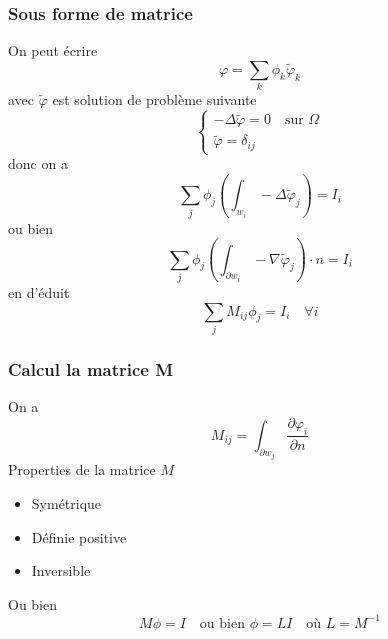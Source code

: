 \begin{frame}
\frametitle{Sous forme de matrice}
On peut \'ecrire
 \begin{equation}
 \varphi = \sum_k \phi_k \tilde{\varphi}_k
 \end{equation}
 avec $\tilde{\varphi}$ est solution de probl\`eme suivante 
 \begin{equation}
 \begin{cases}
 -\Delta\tilde{\varphi} = 0 \quad \text{sur } \Omega \\
 \tilde{\varphi} = \delta_{ij} 
 \end{cases}
 \end{equation}
 donc on a
 \begin{equation}
 \sum_j \phi_j \left( \int_{w_i}-\Delta\tilde{\varphi}_j \right) =I_i
 \end{equation}
 ou bien
 \begin{equation}
  \sum_j \phi_j \left( \int_{\partial w_i}-\nabla\tilde{\varphi}_j \right) \cdot n =I_i
 \end{equation}
 en d'\'eduit
  \begin{equation}
  \sum_j M_{ij}\phi_j =I_i \quad \forall i 
 \end{equation}
%


\end{frame} 

 \begin{frame}
\frametitle{Calcul la matrice M}
On a
\begin{equation}
  M_{ij} = \int_{\partial w_j} \frac{\partial\varphi_i}{\partial n}
\end{equation}
 Properties de la matrice $M$
 \begin{itemize}
 \item Sym\'etrique 
 \item D\'efinie positive
 \item Inversible
 \end{itemize}
 Ou bien
\begin{equation}
  M\phi =I \quad \text{ou bien } \phi =LI \quad \text{o\`u } L=M^{-1} 
\end{equation}


\end{frame} 

